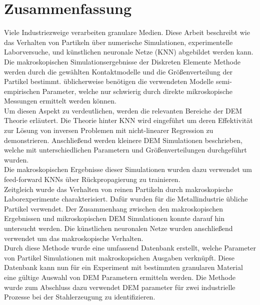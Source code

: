 \chapter*{Zusammenfassung}
\label{cap:zusammenfassung}
Viele Industriezweige verarbeiten granulare Medien.
Diese Arbeit beschreibt wie das Verhalten von Partikeln \"{u}ber numerische Simulationen, 
experimentelle Laborversuche, und k\"{u}nstlichen neuronale Netze (KNN) abgebildet werden kann.
Die makroskopischen Simulationsergebnisse der Diskreten Elemente Methode 
werden durch die gew\"{a}hlten Kontaktmodelle und die Gr\"{o}{\ss}enverteilung der Partikel bestimmt.
\"{u}blicherweise ben\"{o}tigen die verwendeten Modelle semi-empirischen Parameter,
welche nur schwierig durch direkte mikroskopische Messungen ermittelt werden
k\"{o}nnen.\\
Um diesen Aspekt zu verdeutlichen, werden die relevanten Bereiche der DEM Theorie erl\"{a}utert.
Die Theorie hinter KNN wird eingef\"{u}hrt um deren Effektivit\"{a}t zur L\"{o}sung von inversen 
Problemen mit nicht-linearer Regression zu demonstrieren.
Anschlie{\ss}end werden kleinere DEM Simulationen beschrieben, welche mit unterschiedlichen Parametern und 
Gr\"{o}{\ss}enverteilungen durchgef\"{u}hrt wurden. \\
Die makroskopischen Ergebnisse dieser Simulationen wurden dazu verwendet um
feed-forward KNNs \"{u}ber R\"{u}ckpropagierung zu trainieren.\\
Zeitgleich wurde das Verhalten von reinen Partikeln durch makroskopische Laborexperimente charakterisiert. 
Daf\"{u}r wurden f\"{u}r die Metallindustrie \"{u}bliche Partikel verwendet.
Der Zusammenhang zwischen den makroskopischen Ergebnissen und mikroskopischen DEM 
Simulationen konnte darauf hin untersucht werden.
Die k\"{u}nstlichen neuronalen Netze wurden anschlie{\ss}end verwendet um das
makroskopische Verhalten.\\
Durch diese Methode wurde eine umfassend Datenbank erstellt, welche Parameter von 
Partikel Simulationen mit makroskopsichen Ausgaben verkn\"{u}pft.
Diese Datenbank kann nun f\"{u}r ein Experiment mit bestimmten granularen Material eine 
g\"{u}ltige Auswahl von DEM Parametern ermitteln werden.
Die Methode wurde zum Abschluss dazu verwendet DEM parameter f\"{u}r zwei industrielle 
Prozesse bei der Stahlerzeugung zu identifizieren.

